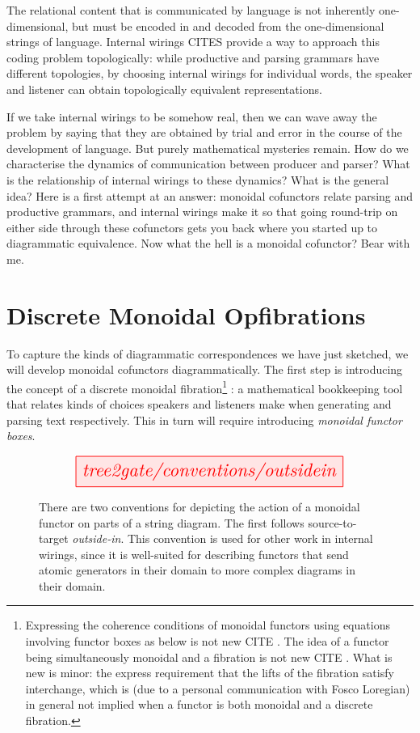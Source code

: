  The relational content that is communicated by language is not inherently one-dimensional, but must be encoded in and decoded from the one-dimensional strings of language. Internal wirings \bR CITES \e provide a way to approach this coding problem topologically: while productive and parsing grammars have different topologies, by choosing internal wirings for individual words, the speaker and listener can obtain topologically equivalent representations.

 If we take internal wirings to be somehow real, then we can wave away the problem by saying that they are obtained by trial and error in the course of the development of language. But purely mathematical mysteries remain. How do we characterise the dynamics of communication between producer and parser? What is the relationship of internal wirings to these dynamics? What is the general idea? Here is a first attempt at an answer: monoidal cofunctors relate parsing and productive grammars, and internal wirings make it so that going round-trip on either side through these cofunctors gets you back where you started up to diagrammatic equivalence. Now what the hell is a monoidal cofunctor? Bear with me.

\section{Discrete Monoidal Opfibrations}

To capture the kinds of diagrammatic correspondences we have just sketched, we will develop monoidal cofunctors diagrammatically. The first step is introducing the concept of a discrete monoidal fibration\footnote{Expressing the coherence conditions of monoidal functors using equations involving functor boxes as below is not new \bR CITE \e. The idea of a functor being simultaneously monoidal and a fibration is not new \bR CITE \e. What is new is minor: the express requirement that the lifts of the fibration satisfy interchange, which is (due to a personal communication with Fosco Loregian) in general not implied when a functor is both monoidal and a discrete fibration.}
: a mathematical bookkeeping tool that relates kinds of choices speakers and listeners make when generating and parsing text respectively. This in turn will require introducing \emph{monoidal functor boxes}.

\begin{figure}[h!]\label{fig:outsidein}
\centering
\[\resizebox{0.75\textwidth}{!}{\tikzfig{tree2gate/conventions/outsidein}}\]
\caption{There are two conventions for depicting the action of a monoidal functor on parts of a string diagram. The first follows source-to-target \emph{outside-in}. This convention is used for other work in internal wirings, since it is well-suited for describing functors that send atomic generators in their domain to more complex diagrams in their domain.}
\end{figure}

